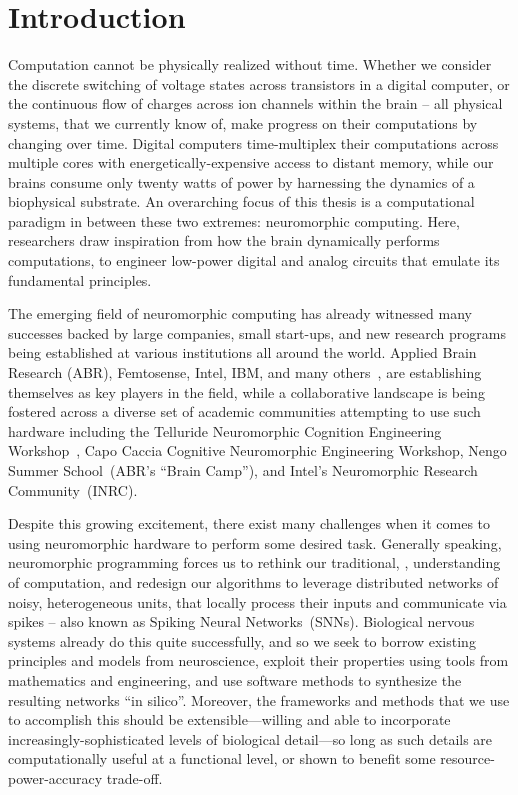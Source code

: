 
\chapter{Introduction}

Computation cannot be physically realized without time.
Whether we consider the discrete switching of voltage states across transistors in a
digital computer,
or the continuous flow of charges across ion channels within the brain -- 
all physical systems, that we currently know of, make progress on their computations
by changing over time.
Digital computers time-multiplex their computations across multiple cores with energetically-expensive access to distant memory, while our brains consume only twenty watts of power by harnessing the dynamics of a biophysical substrate.
An overarching focus of this thesis is a computational paradigm
in between these two extremes: neuromorphic computing.
Here, researchers draw inspiration from how the
brain dynamically performs computations,
to engineer low-power digital and analog circuits that emulate its fundamental principles.

The emerging field of neuromorphic computing has already
witnessed many successes backed by large companies, small start-ups, and new research
programs being established at various institutions all around the world.
Applied Brain Research (ABR), Femtosense, Intel, IBM, and many others~\citep{marketreport2018}, are establishing themselves as key players in the field, while a collaborative landscape is being fostered across a diverse set of academic communities attempting to use such hardware including the Telluride Neuromorphic Cognition Engineering Workshop~\citep{cohen2001report}, Capo Caccia Cognitive Neuromorphic Engineering Workshop, Nengo Summer School~(ABR's ``Brain Camp''), and Intel's Neuromorphic Research Community~(INRC).

Despite this growing excitement, there exist many challenges when it comes to using
neuromorphic hardware to perform some desired task.
Generally speaking, neuromorphic programming forces us to rethink our traditional,
\citet{von1958}, understanding of computation, and redesign our algorithms to leverage distributed networks of noisy, heterogeneous units, that locally process their inputs and communicate via spikes -- also known as Spiking Neural Networks~(SNNs).
Biological nervous systems already do this quite successfully, and so we seek to borrow existing
principles and models from neuroscience, exploit their properties using tools from mathematics and engineering,
and use software methods to synthesize the resulting networks ``in silico''.
Moreover, the frameworks and methods that we use to accomplish this should be extensible---willing and able to incorporate increasingly-sophisticated levels of biological detail---so long as such details are computationally useful at a functional level, or shown to benefit some resource-power-accuracy trade-off.

